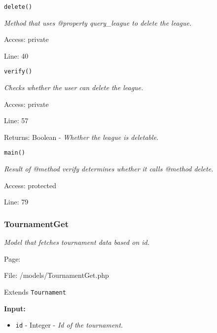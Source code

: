 \texttt{delete()}

{\scriptsize
\textit{Method that uses @property query\_league to delete the league.}

Access: private

Line: 40

}

\texttt{verify()}

{\scriptsize
\textit{Checks whether the user can delete the league.}

Access: private

Line: 57

Returns: Boolean - \textit{Whether the league is deletable.}

}

\texttt{main()}

{\scriptsize
\textit{Result of @method verify determines whether it calls @method delete.}

Access: protected

Line: 79

}

\subsubsection{TournamentGet}\label{TournamentGet.php.doc}
\textit{Model that fetches tournament data based on id.}

Page: \pageref{TournamentGet.php}

File: /models/TournamentGet.php

Extends \texttt{Tournament}

\textbf{Input:}
\begin{itemize}
\item \texttt{id} - Integer - \textit{Id of the tournament.}
\end{itemize}

